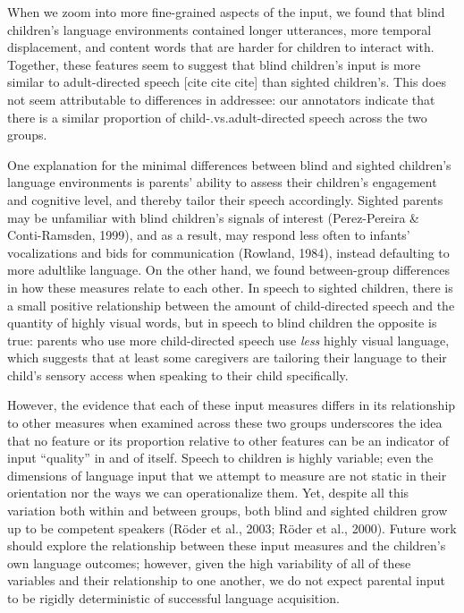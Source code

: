 \documentclass[
  man,floatsintext]{apa6}
\begin{document}
When we zoom into more fine-grained aspects of the input, we found that blind children's language environments contained longer utterances, more temporal displacement, and content words that are harder for children to interact with. Together, these features seem to suggest that blind children's input is more similar to adult-directed speech {[}cite cite cite{]} than sighted children's. This does not seem attributable to differences in addressee: our annotators indicate that there is a similar proportion of child-.vs.adult-directed speech across the two groups.

One explanation for the minimal differences between blind and sighted children's language environments is parents' ability to assess their children's engagement and cognitive level, and thereby tailor their speech accordingly. Sighted parents may be unfamiliar with blind children's signals of interest (Perez-Pereira \& Conti-Ramsden, 1999), and as a result, may respond less often to infants' vocalizations and bids for communication (Rowland, 1984), instead defaulting to more adultlike language. On the other hand, we found between-group differences in how these measures relate to each other. In speech to sighted children, there is a small positive relationship between the amount of child-directed speech and the quantity of highly visual words, but in speech to blind children the opposite is true: parents who use more child-directed speech use \emph{less} highly visual language, which suggests that at least some caregivers are tailoring their language to their child's sensory access when speaking to their child specifically.

However, the evidence that each of these input measures differs in its relationship to other measures when examined across these two groups underscores the idea that no feature or its proportion relative to other features can be an indicator of input ``quality'' in and of itself. Speech to children is highly variable; even the dimensions of language input that we attempt to measure are not static in their orientation nor the ways we can operationalize them. Yet, despite all this variation both within and between groups, both blind and sighted children grow up to be competent speakers (Röder et al., 2003; Röder et al., 2000). Future work should explore the relationship between these input measures and the children's own language outcomes; however, given the high variability of all of these variables and their relationship to one another, we do not expect parental input to be rigidly deterministic of successful language acquisition.
\end{document}
